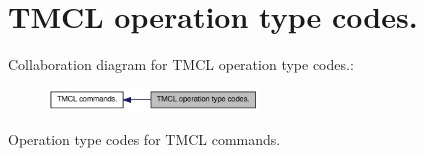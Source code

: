 \hypertarget{group__TypeCodes}{
\section{TMCL operation type codes.}
\label{group__TypeCodes}
}


Collaboration diagram for TMCL operation type codes.:\nopagebreak
\begin{figure}[H]
\begin{center}
\leavevmode
\includegraphics[width=158pt]{group__TypeCodes}
\end{center}
\end{figure}
Operation type codes for TMCL commands. 